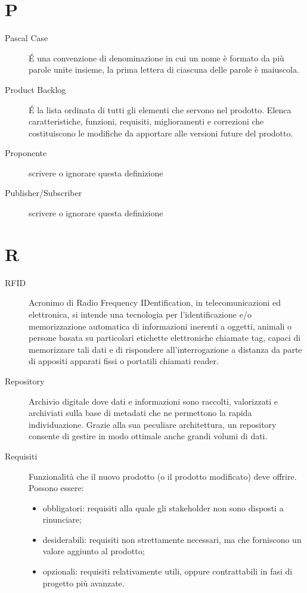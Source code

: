 \documentclass[a4paper, oneside]{article}
\begin{document}
\section{P}
\begin{description}
  \item[Pascal Case] É una convenzione di denominazione in cui un nome è formato da più parole unite insieme, la prima lettera di ciascuna delle parole è maiuscola.
  \item[Product Backlog] É la lista ordinata di tutti gli elementi che servono nel prodotto. Elenca caratteristiche, funzioni, requisiti, miglioramenti e correzioni che costituiscono le modifiche da apportare alle versioni future del prodotto.
  \item[Proponente] {scrivere o ignorare questa definizione}
  \item[Publisher/Subscriber] {scrivere o ignorare questa definizione}
\end{description}
\newpage
\section{R}
\begin{description}
  \item[RFID] Acronimo di Radio Frequency IDentification, in telecomunicazioni ed elettronica, si intende una tecnologia per l'identificazione e/o memorizzazione automatica di informazioni inerenti a oggetti, animali o persone basata su particolari etichette elettroniche chiamate tag, capaci di memorizzare tali dati e di rispondere all'interrogazione a distanza da parte di appositi apparati fissi o portatili chiamati reader.
  \item[Repository] Archivio digitale dove dati e informazioni sono raccolti, valorizzati e archiviati sulla base di metadati che ne permettono la rapida individuazione. Grazie alla sua peculiare architettura, un repository consente di gestire in modo ottimale anche grandi volumi di dati.
  \item[Requisiti] Funzionalità che il nuovo prodotto (o il prodotto modificato) deve offrire. Possono essere: \begin{itemize} \item obbligatori: requisiti alla quale gli stakeholder non sono disposti a rinunciare; \item desiderabili: requisiti non strettamente necessari, ma che forniscono un valore aggiunto al prodotto; \item opzionali: requisiti relativamente utili, oppure contrattabili in fasi di progetto più avanzate. \end{itemize}
\end{description}
\newpage
\end{document}
